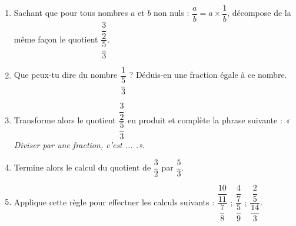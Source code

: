 

\begin{activite}[Divisions]
\begin{enumerate}
\item Sachant que pour tous nombres $a$ et $b$ non nuls : $\dfrac{a}{b}=a \times \dfrac{1}{b}$, décompose de la même façon le quotient $\dfrac{\dfrac{3}{2}}{\dfrac{5}{3}}$.
\item Que peux-tu dire du nombre $\dfrac{1}{\dfrac{5}{3}}$ ? Déduis-en une fraction égale à ce nombre.
\item Transforme alors le quotient $\dfrac{\dfrac{3}{2}}{\dfrac{5}{3}}$ en produit et complète la phrase suivante : \emph{« Diviser par une fraction, c'est ... .».}
\item Termine alors le calcul du quotient de $\dfrac{3}{2}$ par $\dfrac{5}{3}$.
\item Applique cette règle pour effectuer les calculs suivants : $\dfrac{\dfrac{10}{11}}{\dfrac{7}{8}}$ ; $\dfrac{\dfrac{4}{7}}{\dfrac{5}{9}}$ ; $\dfrac{\dfrac{2}{5}}{\dfrac{14}{3}}$.
\end{enumerate}
\end{activite}
